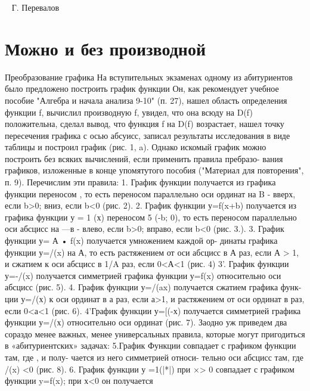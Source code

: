 \documentclass[12pt, a4paper]{book}
\begin{document}
\thispagestyle{firststyle}


\begin{multicols}{2}

\
\newline
\newline
\newline
\newline
\newline
\newline
\newline
\newline
\newline
\newline
Г. Перевалов
\
\newline
\newline
\newline
\section*{Можно и без производной}



Преобразование графика
На вступительных экзаменах одному
из абитуриентов было предложено 
построить график функции 
Он, как рекомендует учебное пособие "Алгебра и начала
анализа 9-10" (п. 27), нашел 
область определения функции f, вычислил производную f, увидел, что
она всюду на D(f) положительна,
сделал вывод, что функция f на D(f)
возрастает, нашел точку пересечения 
графика с осью абсуисс, записал 
результаты исследования в виде 
\columnbreak
таблицы и построил график
(рис. 1, a).
Однако искомый график можно
построить без всяких вычислений,
если применить правила пребразо-
вания графиков, изложенные в конце
упомятутого пособия ("Материал
для повторения", п. 9). Перечислим 
эти правила:
1. График функции  
получается из графика функции
переносом , то есть
переносом параллельно оси ординат
на B - вверх, если b>0; вниз, 
если b<0 (рис. 2).
2. График функции у=f(x+b)
получается из графика функции
у = 1 (х) переносом 5 (-b; 0), то есть
переносом параллельно оси абсцисс
на —в - влево, если b>0; вправо,
если b<0 (рис. 3.).
3. График функции у= А • f(x)
получается умножением каждой ор-
динаты графика функции у=/(x)
на А, то есть растяжением от оси
абсцисс в А раз, если А > 1, и сжатием
к оси абсцисс в 1/A раз, если 0<А<1
(рис. 4)
3'. График функции у=-/(x)
получается симметрией графика
функции у=f(x) относительно оси
абсцисс (рис. 5).
4. График функции у=/(ax)
получается сжатием графика функ-
ции у=/(х) к оси ординат в а раз,
если а>1, и растяжением от оси
ординат в раз, если 0<а<1
(рис. 6).
4'График функции у=[(-х)
получается симметрией графика
функции у=/(х) относительно оси
ординат (рис. 7).
Заодно уж приведем два сораздо
менее важных, менее универсальных
правила, которые могут пригодиться
в «абитуриентских» задачах:
5.График Функции
совпадает с графиком функции 
там, где , и полу-
чается из него симметрией относи-
тельно оси абсцисс там, где /(x) <0
(рис. 8).
6. График функции у =1(|*|) при
×> 0 совпадает с графиком функции
y=f(x); при х<0 он получается
\end{multicols}
\end{document}
